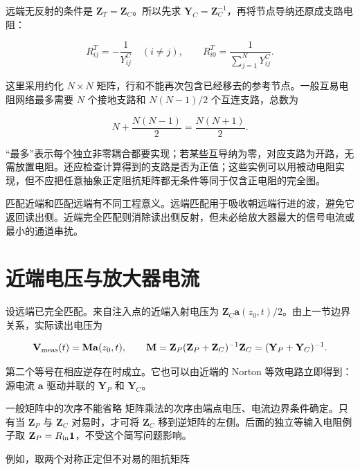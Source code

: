\documentclass[
  11pt,
  a4paper,
  oneside,
  openany]{report}
\numberwithin{equation}{chapter}
\begin{document}
远端无反射的条件是 \(\mathbf Z_T=\mathbf Z_C\)。所以先求
\(\mathbf Y_C=\mathbf Z_C^{-1}\)，再将节点导纳还原成支路电阻：

\nopagebreak[3]
\begin{equation}
R^T_{ij}=-\frac{1}{Y^C_{ij}}\quad(i\ne j),\qquad
R^T_{i0}=\frac{1}{\displaystyle\sum_{j=1}^{N}Y^C_{ij}}.
\end{equation}

这里采用约化 \(N\times N\)
矩阵，行和不能再次包含已经移去的参考节点。一般互易电阻网络最多需要 \(N\)
个接地支路和 \(N(N-1)/2\) 个互连支路，总数为

\nopagebreak[3]
\begin{equation}
N+\frac{N(N-1)}{2}=\frac{N(N+1)}{2}.
\end{equation}

``最多''表示每个独立非零耦合都要实现；若某些互导纳为零，对应支路为开路，无需放置电阻。还应检查计算得到的支路是否为正值；这些实例可以用被动电阻实现，但不应把任意抽象正定阻抗矩阵都无条件等同于仅含正电阻的完全图。

匹配近端和匹配远端有不同工程意义。远端匹配用于吸收朝远端行进的波，避免它返回读出侧。近端完全匹配则消除读出侧反射，但未必给放大器最大的信号电流或最小的通道串扰。

\section{近端电压与放大器电流}\label{sec-readout-matrix}

设远端已完全匹配。来自注入点的近端入射电压为
\(\mathbf Z_C\mathbf a(z_0,t)/2\)。由上一节边界关系，实际读出电压为

\nopagebreak[3]
\begin{equation}
\mathbf V_{\rm meas}(t)=\mathbf M\mathbf a(z_0,t),\qquad
\mathbf M=\mathbf Z_P(\mathbf Z_P+\mathbf Z_C)^{-1}\mathbf Z_C
=(\mathbf Y_P+\mathbf Y_C)^{-1}.
\end{equation}

第二个等号在相应逆存在时成立。它也可以由近端的 Norton
等效电路立即得到：源电流 \(\mathbf a\) 驱动并联的 \(\mathbf Y_P\) 和
\(\mathbf Y_C\)。

\begin{notebox}{一般矩阵中的次序不能省略}
矩阵乘法的次序由端点电压、电流边界条件确定。只有当 $\mathbf Z_P$ 与 $\mathbf Z_C$ 对易时，才可将 $\mathbf Z_C$ 移到逆矩阵的左侧。后面的独立等输入电阻例子取 $\mathbf Z_P=R_{\rm in}\mathbf1$，不受这个简写问题影响。
\end{notebox}

例如，取两个对称正定但不对易的阻抗矩阵
\end{document}
